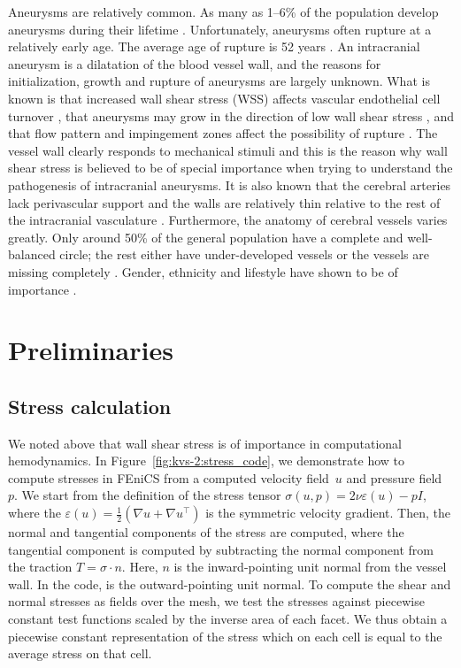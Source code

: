 Aneurysms are relatively common. As many as 1--6\% of the population
develop aneurysms during their
lifetime \citep{Weir2002}. Unfortunately, aneurysms often rupture at a
relatively early age. The average age of rupture is 52
years \citep{Humphrey2001}. An intracranial aneurysm is a dilatation
of the blood vessel wall, and the reasons for initialization, growth
and rupture of aneurysms are largely unknown.  What is known is that
increased wall shear stress (WSS) affects vascular endothelial cell
turnover \citep{DAVIESREMUZZIGORDONEtAl1986}, that aneurysms may grow
in the direction of low wall shear
stress \citep{BousselRayzMcCullochEtAl2008}, and that flow pattern and
impingement zones affect the possibility of
rupture \citep{CebralCastroBurgessEtAl2005}. The vessel wall clearly
responds to mechanical stimuli and this is the reason why wall shear
stress is believed to be of special importance when trying to
understand the pathogenesis of intracranial aneurysms. It is also
known that the cerebral arteries lack perivascular support and the
walls are relatively thin relative to the rest of the intracranial
vasculature \citep{Humphrey2001,Stehbens1975}.  Furthermore, the
anatomy of cerebral vessels varies greatly. Only around 50\% of the
general population have a complete and well-balanced circle; the rest
either have under-developed vessels or the vessels are missing
completely \citep{Fung1984}. Gender, ethnicity and lifestyle have
shown to be of
importance \citep{MhurchuAndersonJamrozikEtAl2001,LongstrethNelsonKoepsellEtAl1994,KongableLanzinoGermansonEtAl1996}.

\section{Preliminaries}

\subsection{Stress calculation}

We noted above that wall shear stress is of importance in
computational hemodynamics. In Figure~\ref{fig:kvs-2:stress_code}, we
demonstrate how to compute stresses in FEniCS from a computed velocity
field~$u$ and pressure field~$p$. We start from the definition of the
stress tensor $\sigma(u,p) = 2 \nu \varepsilon (u) - p I$, where the
$\varepsilon(u) = \frac{1}{2}(\nabla u + \nabla u^{\top})$ is the symmetric
velocity gradient. Then, the normal and tangential components of the
stress are computed, where the tangential component is computed by
subtracting the normal component from the traction $T = \sigma \cdot
n$. Here, $n$ is the inward-pointing unit normal from the vessel
wall. In the code,  is the outward-pointing unit normal. To
compute the shear and normal stresses as fields over the mesh, we test
the stresses against piecewise constant test functions scaled by the
inverse area of each facet. We thus obtain a piecewise constant
representation of the stress which on each cell is equal to the
average stress on that cell.

